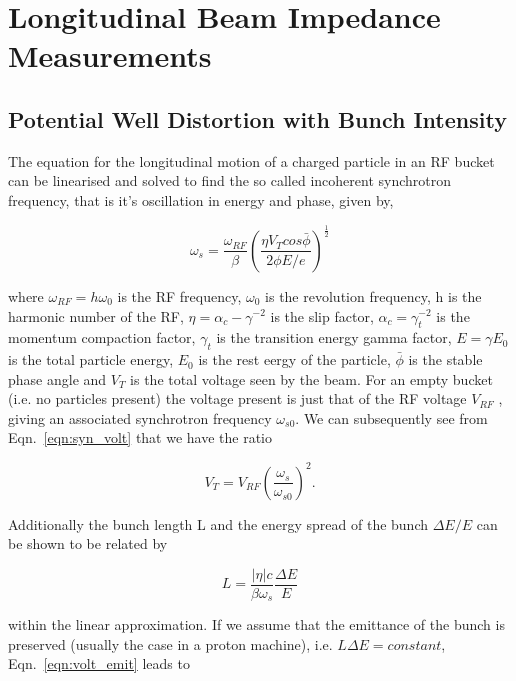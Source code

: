 \section{Longitudinal Beam Impedance Measurements}


\subsection{Potential Well Distortion with Bunch Intensity}

The equation for the longitudinal motion of a charged particle in an RF bucket can be linearised and solved to find the so called incoherent synchrotron frequency, that is it's oscillation in energy and phase, given by,

\begin{equation}
\omega_{s} = \frac{\omega_{RF}}{\beta} \left( \frac{\eta V_{T}cos\bar{\phi}}{2\phi E/e}  \right)^{\frac{1}{2}}
\label{eqn:syn_volt}
\end{equation}

where $\omega_{RF} = h\omega_{0}$ is the RF frequency, $\omega_{0}$ is the revolution frequency, h is the harmonic
number of the RF, $\eta = \alpha_{c} - \gamma^{-2}$ is the slip factor, $\alpha_{c} = \gamma_{t}^{-2}$ is the momentum compaction factor, $\gamma_{t}$ is the transition energy gamma factor, $E=\gamma E_{0}$ is the total particle energy, $E_{0}$ is the rest eergy of the particle, $\bar{\phi}$ is the stable phase angle and $V_{T}$ is the total voltage seen by the beam. For an empty bucket (i.e. no particles present) the voltage present is just that of the RF voltage $V_{RF}$ , giving an associated synchrotron frequency $\omega_{s0}$. We can subsequently see from Eqn.~\ref{eqn:syn_volt} that we have the ratio

\begin{equation}
V_{T} = V_{RF}\left(  \frac{\omega_{s}}{\omega_{s0}} \right)^{2}.
\label{eqn:volt_emit}
\end{equation}

Additionally the bunch length L and the energy spread of the bunch $\Delta E/E$ can be shown to be related by

\begin{equation}
L = \frac{\left| \eta \right|c}{\beta\omega_{s}}\frac{\Delta E}{E}
\end{equation}

within the linear approximation. If we assume that the emittance of the bunch is preserved (usually the case in a proton machine), i.e. $L\Delta E = constant$, Eqn.~\ref{eqn:volt_emit} leads to

